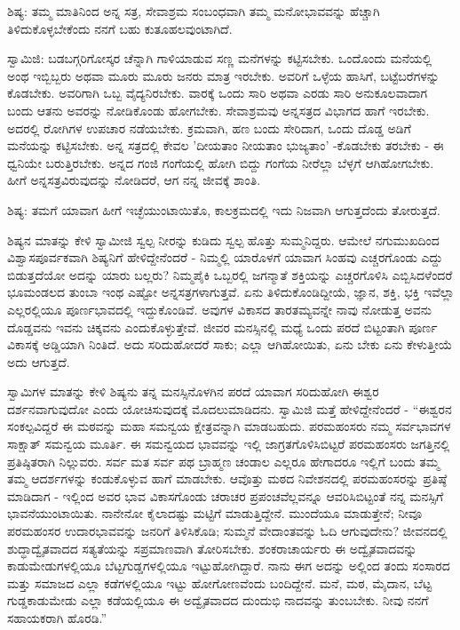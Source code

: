 ಶಿಷ್ಯ: ತಮ್ಮ ಮಾತಿನಿಂದ ಅನ್ನ ಸತ್ರ, ಸೇವಾಶ್ರಮ ಸಂಬಂಧವಾಗಿ ತಮ್ಮ ಮನೋಭಾವವನ್ನು ಹೆಚ್ಚಾಗಿ ತಿಳಿದುಕೊಳ್ಳಬೇಕೆಂದು ನನಗೆ ಬಹು ಕುತೂಹಲವುಂಟಾಗಿದೆ.

ಸ್ವಾಮಿಜಿ: ಬಡಬಗ್ಗರಿಗೋಸ್ಕರ ಚೆನ್ನಾಗಿ ಗಾಳಿಯಾಡುವ ಸಣ್ಣ ಮನೆಗಳನ್ನು ಕಟ್ಟಿಸಬೇಕು. ಒಂದೊಂದು ಮನೆಯಲ್ಲಿ ಅಂಥ ಇಬ್ಬಿಬ್ಬರು ಅಥವಾ ಮೂರು ಮೂರು ಜನರು ಮಾತ್ರ ಇರಬೇಕು. ಅವರಿಗೆ ಒಳ್ಳೆಯ ಹಾಸಿಗೆ, ಬಟ್ಟೆಬರೆಗಳನ್ನು ಕೊಡಬೇಕು. ಅವರಿಗಾಗಿ ಒಬ್ಬ ವೈದ್ಯನಿರಬೇಕು. ವಾರಕ್ಕೆ ಒಂದು ಸಾರಿ ಅಥವಾ ಎರಡು ಸಾರಿ ಅನುಕೂಲವಾದಾಗ ಬಂದು ಆತನು ಅವರನ್ನು ನೋಡಿಕೊಂಡು ಹೋಗಬೇಕು. ಸೇವಾಶ್ರಮವು ಅನ್ನಸತ್ರದ ವಿಭಾಗದ ಹಾಗೆ ಇರಬೇಕು. ಅದರಲ್ಲಿ ರೋಗಿಗಳ ಉಪಚಾರ ನಡೆಯಬೇಕು. ಕ್ರಮವಾಗಿ, ಹಣ ಬಂದು ಸೇರಿದಾಗ, ಒಂದು ದೊಡ್ಡ ಅಡಿಗೆ ಮನೆಯನ್ನು ಕಟ್ಟಿಸಬೇಕು. ಅನ್ನ ಸತ್ರದಲ್ಲಿ ಕೇವಲ 'ದೀಯತಾಂ ನೀಯತಾಂ ಭುಜ್ಯತಾಂ' -ಕೊಡಬೇಕು ತರಬೇಕು - ಈ ಧ್ವನಿಯೇ ಬರುತ್ತಿರಬೇಕು. ಅನ್ನದ ಗಂಜಿ ಗಂಗೆಯಲ್ಲಿ ಹೋಗಿ ಬಿದ್ದು ಗಂಗೆಯ ನೀರೆಲ್ಲಾ ಬೆಳ್ಳಗೆ ಆಗಿಹೋಗಬೇಕು. ಹೀಗೆ ಅನ್ನಸತ್ರವಿರುವುದನ್ನು ನೋಡಿದರೆ, ಆಗ ನನ್ನ ಜೀವಕ್ಕೆ ಶಾಂತಿ.

ಶಿಷ್ಯ: ತಮಗೆ ಯಾವಾಗ ಹೀಗೆ ಇಚ್ಛೆಯುಂಟಾಯಿತೊ, ಕಾಲಕ್ರಮದಲ್ಲಿ ಇದು ನಿಜವಾಗಿ ಆಗುತ್ತದೆಂದು ತೋರುತ್ತದೆ.

ಶಿಷ್ಯನ ಮಾತನ್ನು ಕೇಳಿ ಸ್ವಾಮೀಜಿ ಸ್ವಲ್ಪ ನೀರನ್ನು ಕುಡಿದು ಸ್ವಲ್ಪ ಹೊತ್ತು ಸುಮ್ಮನಿದ್ದರು. ಆಮೇಲೆ ನಗುಮುಖದಿಂದ ವಿಶ್ವಾಸಪೂರ್ವಕವಾಗಿ ಶಿಷ್ಯನಿಗೆ ಹೇಳಿದ್ದೇನೆಂದರೆ - ನಿಮ್ಮಲ್ಲಿ ಯಾರೊಳಗೆ ಯಾವಾಗ ಸಿಂಹವು ಎಚ್ಚರಗೊಂಡು ಎದ್ದು ಬಿಡುತ್ತದೆಯೋ ಅದನ್ನು ಯಾರು ಬಲ್ಲರು? ನಿಮ್ಮಪೈಕಿ ಒಬ್ಬರಲ್ಲಿ ಜಗನ್ಮಾತೆ ಶಕ್ತಿಯನ್ನು ಎಚ್ಚರಗೊಳಿಸಿ ಎಬ್ಬಿಸಿದಳೆಂದರೆ ಭೂಮಂಡಲದ ತುಂಬಾ ಇಂಥ ಎಷ್ಟೋ ಅನ್ನಸತ್ರಗಳಾಗುತ್ತವೆ. ಏನು ತಿಳಿದುಕೊಂಡಿದ್ದೀಯೆ, ಜ್ಞಾನ, ಶಕ್ತಿ, ಭಕ್ತಿ ಇವೆಲ್ಲಾ ಎಲ್ಲರಲ್ಲಿಯೂ ಪೂರ್ಣಭಾವದಲ್ಲಿ ಇದ್ದುಕೊಂಡಿವೆ. ಅವುಗಳ ವಿಕಾಸದ ತಾರತಮ್ಯವನ್ನೇ ನಾವು ನೋಡುತ್ತ ಅವನು ದೊಡ್ಡವನು ಇವನು ಚಿಕ್ಕವನು ಎಂದುಕೊಳ್ಳುತ್ತೇವೆ. ಜೀವರ ಮನಸ್ಸಿನಲ್ಲಿ ಮಧ್ಯೆ ಒಂದು ಪರದೆ ಬಿಟ್ಟಂತಾಗಿ ಪೂರ್ಣ ವಿಕಾಸಕ್ಕೆ ಅಡ್ಡಿಯಾಗಿ ನಿಂತಿದೆ. ಅದು ಸರಿದುಹೋದರೆ ಸಾಕು; ಎಲ್ಲಾ ಆಗಿಹೋಯಿತು, ಏನು ಬೇಕು ಏನು ಕೇಳುತ್ತೀಯೆ ಅದು ಆಗುತ್ತದೆ.

ಸ್ವಾಮಿಗಳ ಮಾತನ್ನು ಕೇಳಿ ಶಿಷ್ಯನು ತನ್ನ ಮನಸ್ಸಿನೊಳಗಿನ ಪರದೆ ಯಾವಾಗ ಸರಿದುಹೋಗಿ ಈಶ್ವರ ದರ್ಶನವಾಗುವುದೋ ಎಂದು ಯೋಚಿಸುವುದಕ್ಕೆ ಮೊದಲುಮಾಡಿದನು. ಸ್ವಾಮಿಜಿ ಮತ್ತೆ ಹೇಳಿದ್ದೇನೆಂದರೆ - “ಈಶ್ವರನ ಸಂಕಲ್ಪವಿದ್ದರೆ ಈ ಮಠವನ್ನು ಮಹಾ ಸಮನ್ವಯ ಕ್ಷೇತ್ರವನ್ನಾಗಿ ಮಾಡಬಹುದು. ಪರಮಹಂಸರು ನಮ್ಮ ಸರ್ವಭಾವಗಳ ಸಾಕ್ಷಾತ್ ಸಮನ್ವಯ ಮೂರ್ತಿ. ಈ ಸಮನ್ವಯದ ಭಾವವನ್ನು ಇಲ್ಲಿ ಜಾಗ್ರತಗೊಳಿಸಿಬಿಟ್ಟರೆ ಪರಮಹಂಸರು ಜಗತ್ತಿನಲ್ಲಿ ಪ್ರತಿಷ್ಠಿತರಾಗಿ ನಿಲ್ಲುವರು. ಸರ್ವ ಮತ ಸರ್ವ ಪಥ ಬ್ರಾಹ್ಮಣ ಚಂಡಾಲ ಎಲ್ಲರೂ ಹೇಗಾದರೂ ಇಲ್ಲಿಗೆ ಬಂದು ತಮ್ಮ ತಮ್ಮ ಆದರ್ಶಗಳನ್ನು ಕಂಡುಕೊಳ್ಳುವ ಹಾಗೆ ಮಾಡಬೇಕು. ಆವೊತ್ತು ಮಠದ ನಿವೇಶನದಲ್ಲಿ ಪರಮಹಂಸರನ್ನು ಪ್ರತಿಷ್ಠೆ ಮಾಡಿದಾಗ - ಇಲ್ಲಿಂದ ಅವರ ಭಾವ ವಿಕಾಸಗೊಂಡು ಚರಾಚರ ಪ್ರಪಂಚವೆಲ್ಲವನ್ನೂ ಆವರಿಸಿಬಿಟ್ಟಂತೆ ನನ್ನ ಮನಸ್ಸಿಗೆ ಭಾವನೆಯುಂಟಾಯಿತು. ನಾನೇನೋ ಕೈಲಾದಷ್ಟು ಮಟ್ಟಿಗೆ ಮಾಡುತ್ತಿದ್ದೇನೆ. ಮುಂದೆಯೂ ಮಾಡುತ್ತೇನೆ; ನೀವೂ ಪರಮಹಂಸರ ಉದಾರಭಾವವನ್ನು ಜನರಿಗೆ ತಿಳಿಸಿಕೊಡಿ; ಸುಮ್ಮನೆ ವೇದಾಂತವನ್ನು ಓದಿ ಆಗುವುದೇನು? ಜೀವನದಲ್ಲಿ ಶುದ್ಧಾದ್ವೈತವಾದದ ಸತ್ಯತೆಯನ್ನು ಸಪ್ರಮಾಣವಾಗಿ ತೋರಿಸಬೇಕು. ಶಂಕರಾಚಾರ್ಯರು ಈ ಅದ್ವೈತವಾದವನ್ನು ಕಾಡುಮೇಡುಗಳಲ್ಲಿಯೂ ಬೆಟ್ಟಗುಡ್ಡಗಳಲ್ಲಿಯೂ ಇಟ್ಟುಹೋಗಿದ್ದಾರೆ. ನಾನು ಈಗ ಅದನ್ನು ಅಲ್ಲಿಂದ ತಂದು ಸಂಸಾರದ ಮತ್ತು ಸಮಾಜದ ಎಲ್ಲಾ ಕಡೆಗಳಲ್ಲಿಯೂ ಇಟ್ಟು ಹೋಗೋಣವೆಂದು ಬಂದಿದ್ದೇನೆ. ಮನೆ, ಮಠ, ಮೈದಾನ, ಬೆಟ್ಟ ಗುಡ್ಡಕಾಡುಮೇಡು ಎಲ್ಲಾ ಕಡೆಯಲ್ಲಿಯೂ ಈ ಅದ್ವೈತವಾದದ ದುಂದುಭಿ ನಾದವನ್ನು ತುಂಬಬೇಕು. ನೀವು ನನಗೆ ಸಹಾಯಕರಾಗಿ ಹೊರಡಿ.”

